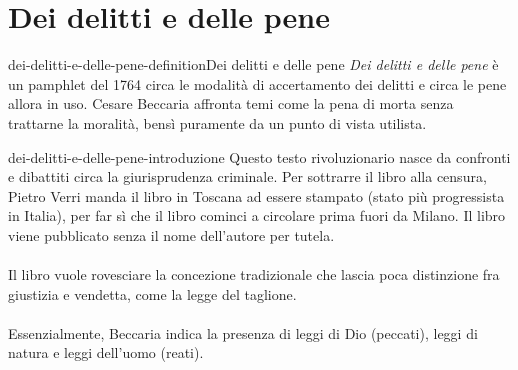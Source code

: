 \documentclass[preview]{standalone}
\begin{document}
\genpage

\section{Dei delitti e delle pene}

\begin{snippetdefinition}{dei-delitti-e-delle-pene-definition}{Dei delitti e delle pene}
    \textit{Dei delitti e delle pene} è un pamphlet del 1764 circa
    le modalità di accertamento dei delitti e circa le pene allora in uso.
    Cesare Beccaria affronta temi come la pena di morta senza trattarne la moralità, bensì puramente
    da un punto di vista utilista.
\end{snippetdefinition}

\begin{snippet}{dei-delitti-e-delle-pene-introduzione}
    Questo testo rivoluzionario nasce da confronti e dibattiti circa la giurisprudenza criminale.
    Per sottrarre il libro alla censura, Pietro Verri manda il libro in Toscana
    ad essere stampato (stato più progressista in Italia),
    per far sì che il libro cominci a circolare prima fuori da Milano.
    Il libro viene pubblicato senza il nome dell'autore per tutela.
    \\\\
    Il libro vuole rovesciare la concezione tradizionale che lascia poca distinzione fra giustizia e vendetta,
    come la legge del taglione.
    \\\\
    Essenzialmente, Beccaria indica la presenza di leggi di Dio (peccati), leggi di natura e leggi dell'uomo (reati).
\end{snippet}
\end{document}
